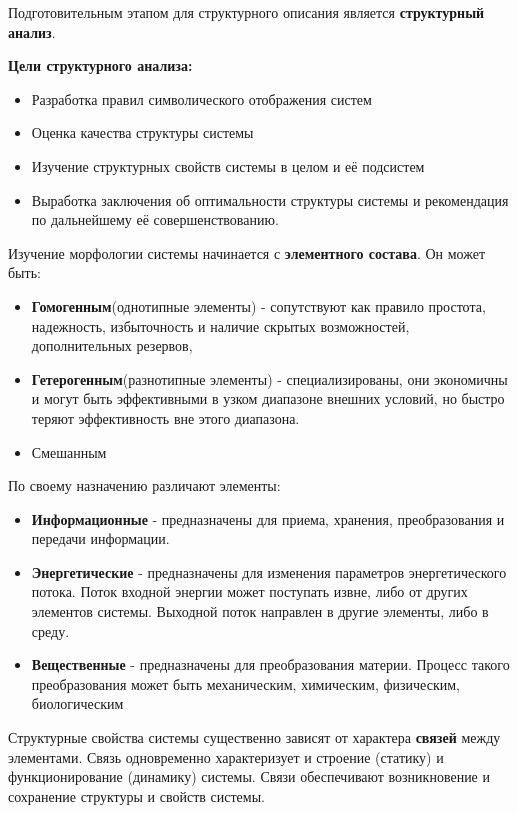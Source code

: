 \documentclass[a4paper]{article}
\begin{document}
	Подготовительным этапом для структурного описания является \textbf{структурный анализ}.
	
\textbf{Цели структурного анализа:}
		\begin{itemize}
		\item Разработка правил символического отображения систем
		\item Оценка качества структуры системы
		\item Изучение структурных свойств системы в целом и её подсистем
		\item Выработка заключения об оптимальности структуры системы и рекомендация по дальнейшему её совершенствованию.
	\end{itemize}

	Изучение морфологии системы начинается с \textbf{элементного состава}. Он может быть:
		\begin{itemize}
		\item \textbf{Гомогенным}(однотипные элементы) - сопутствуют как правило простота, надежность, избыточность и наличие скрытых возможностей, дополнительных резервов,
		\item \textbf{Гетерогенным}(разнотипные элементы) - специализированы, они экономичны и могут быть эффективными в узком диапазоне внешних условий, но быстро теряют эффективность вне этого диапазона.
		\item Смешанным
	\end{itemize}

	 По своему назначению различают элементы:
	 \begin{itemize}
	 \item \textbf{Информационные} - предназначены для приема, хранения, преобразования и передачи информации.
	 \item \textbf{Энергетические} - предназначены для изменения параметров энергетического потока. Поток входной энергии может поступать извне, либо от других элементов системы. Выходной поток направлен в другие элементы, либо в среду.
	 \item \textbf{Вещественные} - предназначены для преобразования материи. Процесс такого преобразования может быть механическим, химическим, физическим, биологическим
 \end{itemize}

	Структурные свойства системы существенно зависят от характера \textbf{связей} между элементами. Связь одновременно характеризует и строение (статику) и функционирование (динамику) системы. Связи обеспечивают возникновение и сохранение структуры и свойств системы.
	
\end{document}
